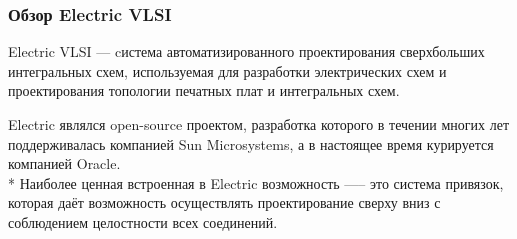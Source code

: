 \subsubsection{Обзор Electric VLSI}
\begin{par}
Electric VLSI --- cистема автоматизированного проектирования сверхбольших интегральных схем, используемая для разработки электрических схем и проектирования
топологии печатных плат и интегральных схем.
\end{par}
\begin{par}
Electric являлся open-source проектом, разработка
которого в течении многих лет поддерживалась \cite{electric} компанией Sun Microsystems,
а в настоящее время курируется компанией Oracle. \\*
Наиболее ценная встроенная в Electric возможность —-- это система привязок,
которая даёт возможность осуществлять проектирование сверху вниз с соблюдением целостности
всех соединений.
\end{par}

